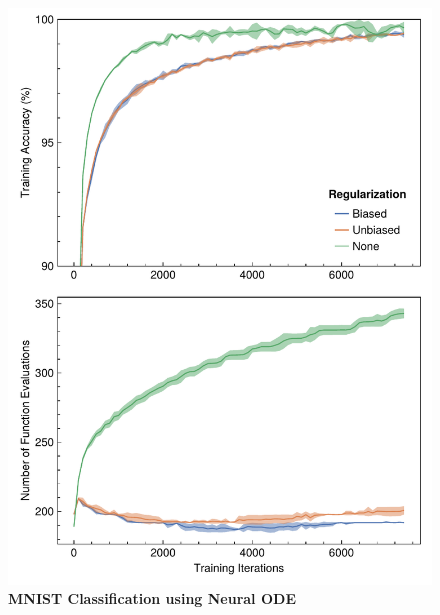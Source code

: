 \begin{figure}[t]
  \centering
  \begin{minipage}[c]{0.49\textwidth}
    \includegraphics[width=\linewidth]{../figures/local_regularizing_neural_des/mnist_ode.pdf}
    \caption{\textbf{MNIST Classification using Neural ODE}}
    \label{fig:mnist_node_localreg}
  \end{minipage}
  \hfill
  \begin{minipage}[c]{0.49\textwidth}

\end{minipage}
\end{figure}
